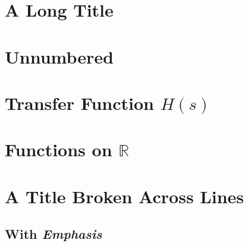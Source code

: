\documentclass{article}
\newcommand{\R}{\mathbb{R}}
\begin{document}
\section[Short]{A Long Title}
\section*{Unnumbered}
\section{Transfer Function \texorpdfstring{$H(s)$}{H(s)}}
\section{Functions on $\R$}
\section{A Title Broken
Across Lines}
\subsection{With \emph{Emphasis}}
\end{document}
